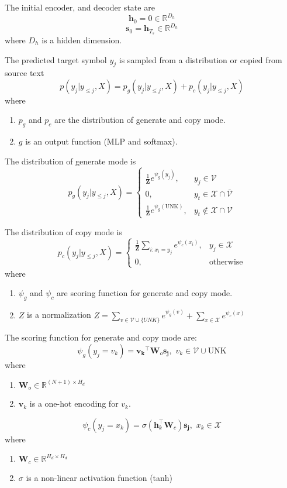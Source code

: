 \documentclass{article}
\begin{document}
  The initial encoder, and decoder state are
  \[
    \mathbf{h}_0 = 0 \in \mathbb{R}^{D_h}
  \]
  \[
    \mathbf{s}_0 = \mathbf{h}_{T_s} \in \mathbb{R}^{D_h}
  \]
  where $D_h$ is a hidden dimension.

  The predicted target symbol $y_j$ is sampled from a distribution or copied from source text
  \[
    p(y_j|y_{\leq j}, X) = p_g(y_j|y_{\leq j}, X) + p_c(y_j|y_{\leq j}, X)
  \]
  where
  \begin{enumerate}
    \item $p_g$ and $p_c$ are the distribution of generate and copy mode.
    \item $g$ is an output function (MLP and softmax).
    \end{enumerate}

  The distribution of generate mode is
  \[
    p_g(y_j|y_{\leq j}, X) =
    \begin{cases}
      \frac{1}{\mathbf{Z}} e^{{\psi}_g(y_j)}, & y_j \in \mathcal{V} \\
      0, & y_t \in \mathcal{X} \cap \mathcal{\bar{V}} \\
      \frac{1}{\mathbf{Z}} e^{{\psi}_g(\text{UNK})}, & y_t \not\in \mathcal{X} \cap \mathcal{V}
    \end{cases}
  \]

  The distribution of copy mode is
  \[
    p_c(y_j|y_{\leq j}, X) =
    \begin{cases}
      \frac{1}{\mathbf{Z}} \sum_{i:x_i=y_j} e^{{\psi}_c(x_i)}, & y_j \in \mathcal{X} \\
      0, & \text{otherwise}
    \end{cases}
  \]
  where
  \begin{enumerate}
    \item $\psi_g$ and $\psi_c$ are scoring function for generate and copy mode.
    \item $Z$ is a normalization $Z = \sum_{v \in \mathcal{V} \cup \{UNK\}} e^{\psi_g(v)} + \sum_{x \in \mathcal{X}} e^{\psi_c(x)}$
  \end{enumerate}

  The scoring function for generate and copy mode are:
  \[
    \psi_g(y_j = v_k) = \mathbf{v_k}^\intercal \mathbf{W}_o \mathbf{s_j},\,\, v_k \in \mathcal{V} \cup \text{UNK}
  \]
  where
  \begin{enumerate}
    \item $\mathbf{W}_o \in \mathbb{R}^{(N+1)\times H_d}$
    \item $\mathbf{v}_k$ is a one-hot encoding for $v_k$.
  \end{enumerate}
  \[
    \psi_c(y_j = x_k) = \sigma (\mathbf{h}_k^\intercal \mathbf{W}_c) \mathbf{s_j},\,\, x_k \in \mathcal{X}
  \]
  where
  \begin{enumerate}
    \item $\mathbf{W}_c \in \mathbb{R}^{H_d\times H_d}$
    \item $\sigma$ is a non-linear activation function (tanh)
  \end{enumerate}
\end{document}
